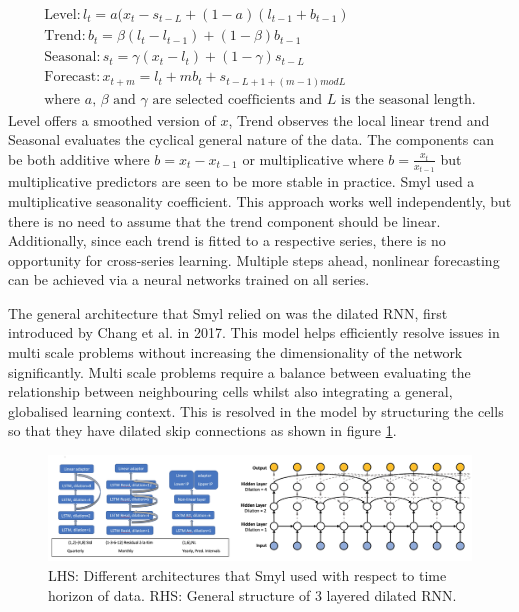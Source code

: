 \documentclass[10pt,onecolumn,letterpaper]{article}
\begin{document}
\vskip -0.5cm
\begin{gather*}
 	\text{Level}: l_{t} = a(x_{t}-s_{t-L}+(1-a)(l_{t-1}+b_{t-1}) \\
	\text{Trend}: b_{t} =  \beta(l_{t}-l_{t-1})+(1-\beta)b_{t-1} \\
	\text{Seasonal}: s_{t} =  \gamma(x_{t}-l_{t})+(1-\gamma)s_{t-L} \\
	\text{Forecast}: x_{t+m} =  l_{t} + mb_{t} + s_{t-L+1+(m-1)modL} \\
	\text{where $a$, $\beta$ and $\gamma$ are selected coefficients and $L$ is the seasonal length.}
\end{gather*}
Level offers a smoothed version of $x$, Trend observes the local linear trend and Seasonal evaluates the cyclical general nature of the data. The components can be both additive where $b = x_{t}-x_{t-1}$ or multiplicative where $b = \frac{x_{t}}{x_{t-1}}$ but multiplicative predictors are seen to be more stable in practice. Smyl used a multiplicative seasonality coefficient. This approach works well independently, but there is no need to assume that the trend component should be linear. Additionally, since each trend is fitted to a respective series, there is no opportunity for cross-series learning. Multiple steps ahead, nonlinear forecasting can be achieved via a neural networks trained on all series. 

The general architecture that Smyl relied on was the dilated RNN, first introduced by Chang et al. in 2017. This model helps efficiently resolve issues in multi scale problems without increasing the dimensionality of the network significantly. Multi scale problems require a balance between evaluating the relationship between neighbouring cells whilst also integrating a general, globalised learning context. This is resolved in the model by structuring the cells so that they have dilated skip connections as shown in figure \ref{chang_architecture}. 


\begin{figure}[!hbt!]
\centering
\includegraphics[width=14.5cm]{smyl_architecture.png}
\caption{LHS: Different architectures that Smyl used with respect to time horizon of data. RHS: General structure of 3 layered dilated RNN.}
\label{chang_architecture}
\end{figure}
\end{document}

